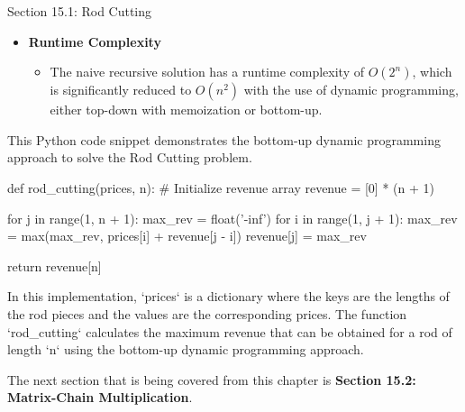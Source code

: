 \begin{notes}{Section 15.1: Rod Cutting}
\begin{itemize}
        \item \textbf{Runtime Complexity}
        \begin{itemize}
            \item The naive recursive solution has a runtime complexity of $O(2^n)$, which is significantly reduced to $O(n^2)$ with the use of dynamic programming, either top-down with memoization or bottom-up.
        \end{itemize}
    \end{itemize}
    
    \begin{highlight}
        This Python code snippet demonstrates the bottom-up dynamic programming approach to solve the Rod Cutting problem.
    \begin{code}[Python]
    def rod_cutting(prices, n):
        # Initialize revenue array
        revenue = [0] * (n + 1)
        
        for j in range(1, n + 1):
            max_rev = float('-inf')
            for i in range(1, j + 1):
                max_rev = max(max_rev, prices[i] + revenue[j - i])
            revenue[j] = max_rev
        
        return revenue[n]
    \end{code}
        In this implementation, `prices` is a dictionary where the keys are the lengths of the rod pieces and the values are the corresponding prices. The function `rod\_cutting` calculates the maximum 
        revenue that can be obtained for a rod of length `n` using the bottom-up dynamic programming approach.
    \end{highlight}    
\end{notes}

The next section that is being covered from this chapter is \textbf{Section 15.2: Matrix-Chain Multiplication}.

